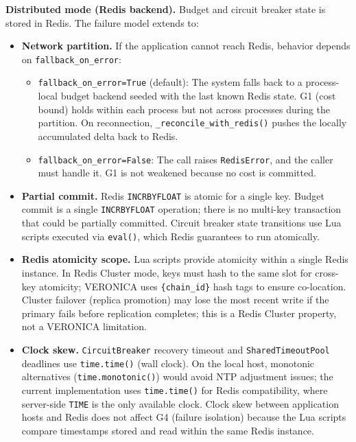 \documentclass[11pt]{article}
\begin{document}
\textbf{Distributed mode (Redis backend).} Budget and circuit breaker state
is stored in Redis. The failure model extends to:

\begin{itemize}[nosep]
  \item \textbf{Network partition.} If the application cannot reach Redis,
    behavior depends on \texttt{fallback\_on\_error}:
    \begin{itemize}[nosep]
      \item \texttt{fallback\_on\_error=True} (default): The system falls back
        to a process-local budget backend seeded with the last known Redis
        state. G1 (cost bound) holds within each process but not across
        processes during the partition. On reconnection,
        \texttt{\_reconcile\_with\_redis()} pushes the locally accumulated
        delta back to Redis.
      \item \texttt{fallback\_on\_error=False}: The call raises
        \texttt{RedisError}, and the caller must handle it. G1 is not weakened
        because no cost is committed.
    \end{itemize}
  \item \textbf{Partial commit.} Redis \texttt{INCRBYFLOAT} is atomic for a
    single key. Budget commit is a single \texttt{INCRBYFLOAT} operation;
    there is no multi-key transaction that could be partially committed.
    Circuit breaker state transitions use Lua scripts executed via
    \texttt{eval()}, which Redis guarantees to run atomically.
  \item \textbf{Redis atomicity scope.} Lua scripts provide atomicity within a
    single Redis instance. In Redis Cluster mode, keys must hash to the same
    slot for cross-key atomicity; VERONICA uses \texttt{\{chain\_id\}} hash
    tags to ensure co-location. Cluster failover (replica promotion) may lose
    the most recent write if the primary fails before replication completes;
    this is a Redis Cluster property, not a VERONICA limitation.
  \item \textbf{Clock skew.} \texttt{CircuitBreaker} recovery timeout and
    \texttt{SharedTimeoutPool} deadlines use \texttt{time.time()} (wall
    clock). On the local host, monotonic alternatives
    (\texttt{time.monotonic()}) would avoid NTP adjustment issues; the current
    implementation uses \texttt{time.time()} for Redis compatibility, where
    server-side \texttt{TIME} is the only available clock. Clock skew between
    application hosts and Redis does not affect G4 (failure isolation) because
    the Lua scripts compare timestamps stored and read within the same Redis
    instance.
\end{itemize}
\end{document}
